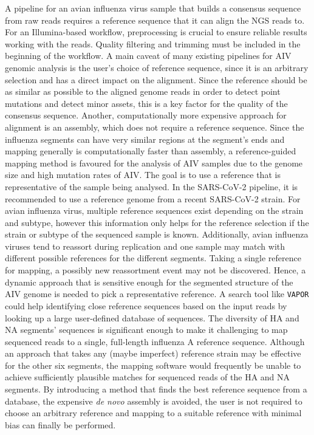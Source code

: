A pipeline for an avian influenza virus sample that builds a consensus sequence from raw reads requires a reference sequence that it can align the \ac{NGS} reads to. For an Illumina-based workflow, preprocessing is crucial to ensure reliable results working with the reads. Quality filtering and trimming must be included in the beginning of the workflow. A main caveat of many existing pipelines for \ac{AIV} genomic analysis is the user's choice of reference sequence, since it is an arbitrary selection and has a direct impact on the alignment. Since the reference should be as similar as possible to the aligned genome reads in order to detect point mutations and detect minor assets, this is a key factor for the quality of the consensus sequence. Another, computationally more expensive approach for alignment is an assembly, which does not require a reference sequence. Since the influenza segments can have very similar regions at the segment's ends and mapping generally is computationally faster than assembly, a reference-guided mapping method is favoured for the analysis of \ac{AIV} samples due to the genome size and high mutation rates of \ac{AIV}. The goal is to use a reference that is representative of the sample being analysed. In the \ac{SARS-CoV-2} pipeline, it is recommended to use a reference genome from a recent \ac{SARS-CoV-2} strain. For avian influenza virus, multiple reference sequences exist depending on the strain and subtype, however this information only helps for the reference selection if the strain or subtype of the sequenced sample is known. Additionally, avian influenza viruses tend to reassort during replication and one sample may match with different possible references for the different segments. Taking a single reference for mapping, a possibly new reassortment event may not be discovered. Hence, a dynamic approach that is sensitive enough for the segmented structure of the \ac{AIV} genome is needed to pick a representative reference. A search tool like \texttt{VAPOR} could help identifying close reference sequences based on the input reads by looking up a large user-defined database of sequences. The diversity of \ac{HA} and \ac{NA} segments' sequences is significant enough to make it challenging to map sequenced reads to a single, full-length influenza A reference sequence. Although an approach that takes any (maybe imperfect) reference strain may be effective for the other six segments, the mapping software would frequently be unable to achieve sufficiently plausible matches for sequenced reads of the \ac{HA} and \ac{NA} segments. By introducing a method that finds the best reference sequence from a database, the expensive \textit{de novo} assembly is avoided, the user is not required to choose an arbitrary reference and mapping to a suitable reference with minimal bias can finally be performed. \\
